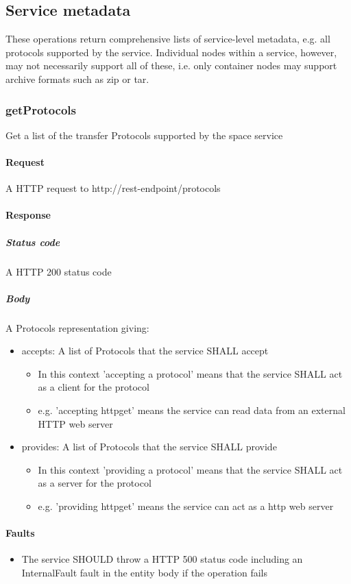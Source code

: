 \documentclass[11pt,a4paper]{ivoa}
\begin{document}
\subsection{Service metadata}
These operations return comprehensive lists of service-level metadata, e.g. all protocols supported by the service. Individual nodes within a service, however, may not necessarily support all of these, i.e. only container nodes may support archive formats such as zip or tar.

\subsubsection{getProtocols}
Get a list of the transfer Protocols supported by the space service

\paragraph{Request}
A HTTP request to http://rest-endpoint/protocols

\paragraph{Response}
\subparagraph{Status code} A HTTP 200 status code
\subparagraph{Body}
A Protocols representation giving:
\begin{itemize}
    \item accepts: A list of Protocols that the service SHALL accept
    \begin{itemize}
        \item In this context 'accepting a protocol' means that the service SHALL act as a client for the protocol
        \item e.g. 'accepting httpget' means the service can read data from an external HTTP web server
    \end{itemize}
    \item provides: A list of Protocols that the service SHALL provide
    \begin{itemize}
        \item In this context 'providing a protocol' means that the service SHALL act as a server for the protocol
        \item e.g. 'providing httpget' means the service can act as a http web server
    \end{itemize}
\end{itemize}

\paragraph{Faults}
\begin{itemize}
    \item The service SHOULD throw a HTTP 500 status code including an InternalFault fault in the entity body if the operation fails
\end{itemize}
\end{document}
